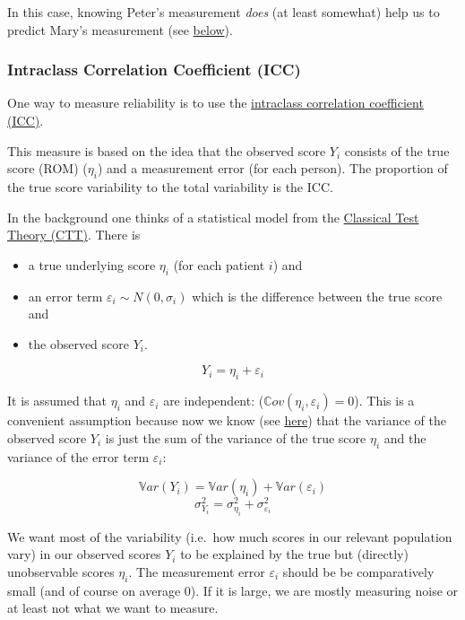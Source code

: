 \documentclass[
]{article}
\providecommand{\tightlist}{%
  \setlength{\itemsep}{0pt}\setlength{\parskip}{0pt}}
\begin{document}
In this case, knowing Peter's measurement \emph{does} (at least somewhat) help us to predict
Mary's measurement (see \hyperref[badnews]{below}).

\subsubsection{Intraclass Correlation Coefficient (ICC)}\label{ICC}

One way to measure reliability is to use the
\href{https://en.wikipedia.org/wiki/Intraclass_correlation}{intraclass correlation coefficient (ICC)}.

This measure is based on the idea that the observed score \(Y_i\) consists of the true score
(ROM) (\(\eta_i\)) and a measurement error (for each person).
The proportion of the true score variability to the total variability is the ICC.

In the background one thinks of a statistical model from the
\href{https://en.wikipedia.org/wiki/Classical_test_theory}{Classical Test Theory (CTT)}.
There is

\begin{itemize}
\tightlist
\item
  a true underlying score \(\eta_i\) (for each patient \(i\)) and
\item
  an error term \(\varepsilon_i \sim N(0, \sigma_i)\) which is the difference between the true
  score and
\item
  the observed score \(Y_i\).
\end{itemize}

\[Y_i = \eta_i + \varepsilon_i\]

It is assumed that \(\eta_i\) and \(\varepsilon_i\) are independent: (\(\mathbb{C}ov(\eta_i, \varepsilon_i)=0\)).
This is a convenient assumption because now we know (see \href{https://en.wikipedia.org/wiki/Variance\#Addition_and_multiplication_by_a_constant}{here})
that the variance
of the observed score \(Y_i\) is just the sum of the variance of the true score \(\eta_i\)
and the variance of the error term \(\varepsilon_i\):

\[\mathbb{V}ar(Y_i) = \mathbb{V}ar(\eta_i) + \mathbb{V}ar(\varepsilon_i)\]
\[\sigma_{Y_i}^2 = \sigma_{\eta_i}^2 + \sigma_{\varepsilon_i}^2\]

We want most of the variability (i.e.~how much scores in our relevant population vary)
in our observed scores \(Y_i\) to be explained by the
true but (directly) unobservable scores \(\eta_i\). The measurement error \(\varepsilon_i\) should be
be comparatively small (and of course on average \(0\)). If it is large, we are mostly measuring noise or at least not
what we want to measure.
\end{document}
